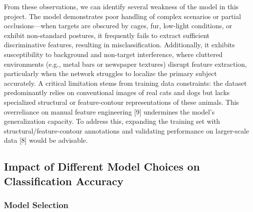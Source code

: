 From these observations, we can identify several weakness of the model
in this project. The model demonstrates \hspace{0pt}\hspace{0pt}poor
handling of complex scenarios or partial
occlusions\hspace{0pt}\hspace{0pt}---when targets are obscured by cages,
fur, low-light conditions, or exhibit non-standard postures, it
frequently fails to extract sufficient discriminative features,
resulting in misclassification. Additionally, it exhibits
\hspace{0pt}\hspace{0pt}susceptibility to background and non-target
interference\hspace{0pt}\hspace{0pt}, where cluttered environments
(e.g., metal bars or newspaper textures) disrupt feature extraction,
particularly when the network struggles to localize the primary subject
accurately. A critical limitation stems from
\hspace{0pt}\hspace{0pt}training data constraints: the dataset
predominantly relies on conventional images of real cats and dogs but
lacks specialized structural or feature-contour representations of these
animals. This overreliance on manual feature engineering {[}9{]}
undermines the model's generalization capacity. To address this,
expanding the training set with structural/feature-contour annotations
and validating performance on larger-scale data {[}8{]} would be
advisable.

\subsection{Impact of Different Model Choices on Classification
Accuracy}\label{impact-of-different-model-choices-on-classification-accuracy}

\subsubsection{Model Selection}\label{model-selection}

